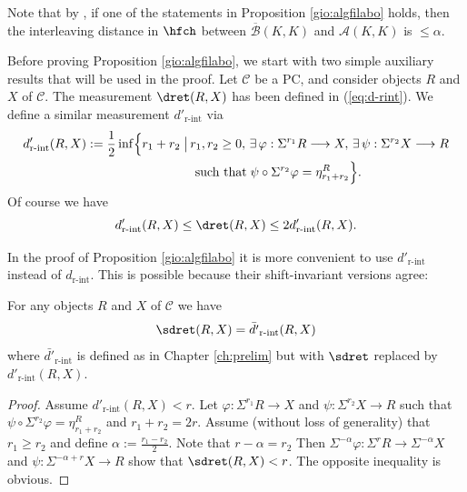 \begin{rem} 
	Note that by \cite[Lemma 2.85]{BCZ:tpc}, if one of the statements in Proposition \ref{gio:algfilabo} holds, then the interleaving distance in $\hfch$ between $\overline{\mathcal{B}}(K,K)$ and $\mathcal{A}(K,K)$ is $\leq \alpha$.
\end{rem}
Before proving Proposition \ref{gio:algfilabo}, we start with two simple auxiliary results that will be used in the proof.
Let $\mathcal{C}$ be a PC, and consider objects $R$ and $X$ of $\mathcal{C}$. The measurement $\dret(R,X)$ has been defined in (\ref{eq:d-rint}). We define  a similar measurement $d'_{\text{r-int}}$ via \begin{align*}
	d'_{\text{r-int}}(R,X):=\frac{1}{2}\inf\Bigl\{r_1+r_2\bigm|&\, r_1,r_2\geq 0, \, \exists \, \varphi: \Sigma^{r_1}R \longrightarrow X,  \, \exists
	\, \psi: \Sigma^{r_2}X
	\longrightarrow R \\ &
	\;\; \text{such that} \; \psi \circ \Sigma^{r_2} \varphi = \eta_{r_1+r_2}^R
	\Bigr\}.
\end{align*} Of course we have $$d'_{\text{r-int}}(R,X) \leq \dret(R,X)\leq2 d'_{\text{r-int}}(R,X).$$

In the proof of Proposition \ref{gio:algfilabo} it is more convenient to use  $d'_{\text{r-int}}$ instead of $d_{\text{r-int}}$.
This is possible because their shift-invariant versions agree:
\begin{lem} For any objects $R$ and $X$ of $\mathcal{C}$ we have
	$$\sdret(R,X) = \bar{d'}_{\text{r-int}}(R,X)$$ where $\bar{d'}_{\text{r-int}}$ is defined as in Chapter \ref{ch:prelim} but with $\sdret$ replaced by $ d'_{\text{r-int}}(R,X)$.
\end{lem} 
\begin{proof}
	Assume $d'_{\text{r-int}}(R,X)<r$. Let $\varphi: \Sigma^{r_1}R \longrightarrow X$ and $\psi: \Sigma^{r_2}X
	\longrightarrow R$ such that $\psi \circ \Sigma^{r_2} \varphi = \eta_{r_1+r_2}^R$ and $r_1+r_2=2r$. Assume (without loss of generality) that $r_1\geq r_2$ and define $\alpha :=\frac{r_1-r_2}{2}$. Note that $r-\alpha = r_2$ Then $\Sigma^{-\alpha}\varphi\colon \Sigma^{r}R\to \Sigma^{-\alpha}X$ and $\psi\colon \Sigma^{-\alpha+r}X\to R$ show that $\sdret(R,X)<r$. The opposite inequality is obvious.
\end{proof}



